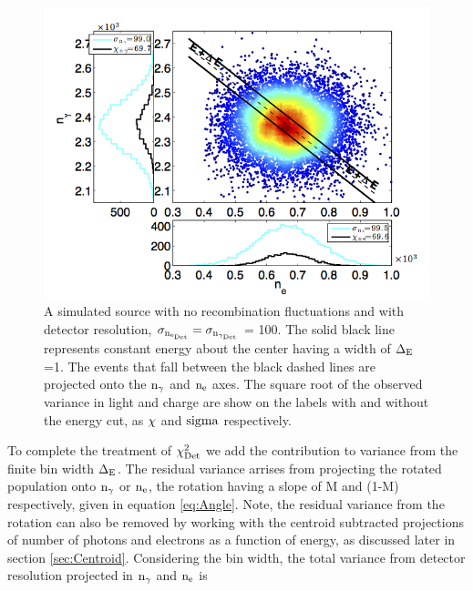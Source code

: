 \renewcommand{\baselinestretch}{1}
\small\normalsize
 \begin{figure}[h!]\centering
\includegraphics[width=160mm]{Chapter_Flucs/Figures/Ex_Plots/EX_Stat_circle_Kr_.png}
\caption{A simulated \KrCal source with no recombination fluctuations and with detector resolution, $\rm \sigma_{n_{e_{Det}}}= \sigma_{n_{\gamma_{Det}}}$ = 100. The solid black line represents constant energy about the center having a width of $\rm \Delta_E$ =1. The events that fall between the black dashed lines are projected onto the $\rm n_\gamma$ and $\rm n_e$ axes. The square root of the observed variance in light and charge are show on the labels with and without the energy cut, as $\rm \chi$ and $\rm sigma$ respectively. }
\label{fig:Kr_ex_Stat_circle}
\end{figure}
\renewcommand{\baselinestretch}{2}
\small\normalsize

\newpage

To complete the treatment of $\rm \chi_{Det}^2$ we add the contribution to variance from the finite bin width $\rm \Delta_E$. The residual variance arrises from projecting the rotated population onto $\rm n_\gamma$ or $\rm n_e$, the rotation having a slope of M and (1-M) respectively, given in equation \ref{eq:Angle}. Note, the residual variance from the rotation can also be removed by working with the centroid subtracted projections of number of photons and electrons as a function of energy, as discussed later in section \ref{sec:Centroid}. Considering the bin width, the total variance from detector resolution projected in $\rm n_\gamma$ and $\rm n_e$ is 


